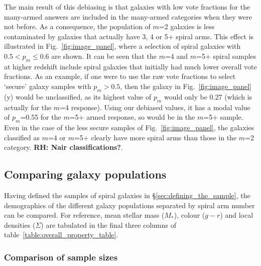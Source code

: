 \documentclass[useAMS,usenatbib]{mn2e}
\newcommand{\rh}[1]{{\bf \textcolor{RoyalPurple}{RH: #1}}}
\begin{document}
The main result of this debiasing is that galaxies with low vote fractions for the many-armed answers are included in the many-armed categories when they were not before. As a consequence, the population of $m$=2 galaxies is less contaminated by galaxies that actually have 3, 4 or 5+ spiral arms. This effect is illustrated in Fig.~\ref{fig:image_panel}, where a selection of spiral galaxies with $0.5 < p_m \leq 0.6$ are shown. It can be seen that the $m$=4 and $m$=5+ spiral samples at higher redshift include spiral galaxies that initially had much lower overall vote fractions. As an example, if one were to use the raw vote fractions to select `secure' galaxy samples with $p_m>0.5$, then the galaxy in Fig.~\ref{fig:image_panel}(y) would be unclassified, as its highest value of $p_m$ would only be 0.27 (which is actually for the $m$=4 response). Using our debiased values, it has a modal value of $p_m$=0.55 for the $m$=5+ armed response, so would be in the $m$=5+ sample. Even in the case of the less secure samples of Fig.~\ref{fig:image_panel}, the galaxies classified as $m$=4 or $m$=5+ clearly have more spiral arms than those in the $m$=2 category. \rh{Nair classifications?}.

\subsection{Comparing galaxy populations}
\label{sec:comparison}

Having defined the samples of spiral galaxies in \S\ref{sec:defining_the_sample}, the demographics of the different galaxy populations separated by spiral arm number can be compared. For reference, mean stellar mass ($M_*$), colour ($g-r$) and local densities ($\Sigma$) are tabulated in the final three columns of table~\ref{table:overall_property_table}.


\subsubsection{Comparison of sample sizes}
\label{sample_fractions}
\end{document}
